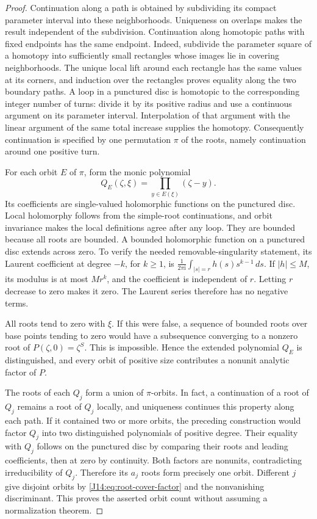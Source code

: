 \documentclass[11pt,oneside]{report}
\theoremstyle{definition}
\numberwithin{equation}{section}
\newcommand{\ii}{\mathrm i}
\begin{document}
\begin{proof}
Continuation along a path is obtained by subdividing its compact
parameter interval into these neighborhoods. Uniqueness on overlaps
makes the result independent of the subdivision. Continuation along
homotopic paths with fixed endpoints has the same endpoint. Indeed,
subdivide the parameter square of a homotopy into sufficiently small
rectangles whose images lie in covering neighborhoods. The unique
local lift around each rectangle has the same values at its corners,
and induction over the rectangles proves equality along the two
boundary paths. A loop in a punctured disc is homotopic to the
corresponding integer number of turns: divide it by its positive
radius and use a continuous argument on its parameter interval.
Interpolation of that argument with the linear argument of the same
total increase supplies the homotopy. Consequently continuation is
specified by one permutation $\pi$ of the roots, namely continuation
around one positive turn.

For each orbit $E$ of $\pi$, form the monic polynomial
\[
 Q_E(\zeta,\xi)=\prod_{y\in E(\xi)}(\zeta-y).
\]
Its coefficients are single-valued holomorphic functions on the
punctured disc. Local holomorphy follows from the simple-root
continuations, and orbit invariance makes the local definitions agree
after any loop. They are bounded because all roots are bounded.
A bounded holomorphic function on a punctured disc extends across
zero. To verify the needed removable-singularity statement, its
Laurent coefficient at degree $-k$, for $k\geq1$, is
$\frac1{2\pi\ii}\int_{|s|=r}h(s)s^{k-1}\,ds$.
If $|h|\leq M$, its modulus is at most $Mr^k$, and the coefficient
is independent of $r$. Letting $r$ decrease to zero makes it zero.
The Laurent series therefore has no negative terms.

All roots tend to zero with $\xi$. If this were false, a sequence of
bounded roots over base points tending to zero would have a subsequence
converging to a nonzero root of $P(\zeta,0)=\zeta^S$.
This is impossible. Hence the extended polynomial $Q_E$ is
distinguished, and every orbit of positive size contributes a nonunit
analytic factor of $P$.

The roots of each $Q_j$ form a union of $\pi$-orbits. In fact, a
continuation of a root of $Q_j$ remains a root of $Q_j$ locally, and
uniqueness continues this property along each path.
If it contained two or more orbits, the preceding construction would
factor $Q_j$ into two distinguished polynomials of positive degree.
Their equality with $Q_j$ follows on the punctured disc by comparing
their roots and leading coefficients, then at zero by continuity.
Both factors are nonunits, contradicting irreducibility of $Q_j$.
Therefore its $a_j$ roots form precisely one orbit. Different $j$
give disjoint orbits by \eqref{J14:eq:root-cover-factor} and the
nonvanishing discriminant. This proves the asserted orbit count
without assuming a normalization theorem.


\end{proof}
\end{document}
